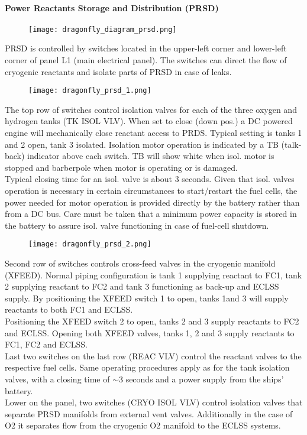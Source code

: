 \documentclass[Orbiter User Manual.tex]{subfiles}
\begin{document}
\paragraph{Power Reactants Storage and Distribution (PRSD)}

\begin{figure}[H]
  \centering
  \texttt{[image: dragonfly\_diagram\_prsd.png]}
\end{figure}

\noindent
PRSD is controlled by switches located in the upper-left corner and lower-left corner of panel L1 (main electrical panel). The switches can direct the flow of cryogenic reactants and isolate parts of PRSD in case of leaks.

\begin{figure}[H]
  \centering
  \texttt{[image: dragonfly\_prsd\_1.png]}
\end{figure}

\noindent
The top row of switches control isolation valves for each of the three oxygen and hydrogen tanks (TK ISOL VLV). When set to close (down pos.) a DC powered engine will mechanically close reactant access to PRDS. Typical setting is tanks 1 and 2 open, tank 3 isolated. Isolation motor operation is indicated by a TB (talk-back) indicator above each switch. TB will show white when isol. motor is stopped and barberpole when motor is operating or is damaged.\\
Typical closing time for an isol. valve is about 3 seconds. Given that isol. valves operation is necessary in certain circumstances to start/restart the fuel cells, the power needed for motor operation is provided directly by the battery rather than from a DC bus. Care must be taken that a minimum power capacity is stored in the battery to assure isol. valve functioning in case of fuel-cell shutdown.

\begin{figure}[H]
  \centering
  \texttt{[image: dragonfly\_prsd\_2.png]}
\end{figure}

\noindent
Second row of switches controls cross-feed valves in the cryogenic manifold (XFEED). Normal piping configuration is tank 1 supplying reactant to FC1, tank 2 supplying reactant to FC2 and tank 3 functioning as back-up and ECLSS supply. By positioning the XFEED switch 1 to open, tanks 1and 3 will supply reactants to both FC1 and ECLSS.\\
Positioning the XFEED switch 2 to open, tanks 2 and 3 supply reactants to FC2 and ECLSS. Opening both XFEED valves, tanks 1, 2 and 3 supply reactants to FC1, FC2 and ECLSS.\\
Last two switches on the last row (REAC VLV) control the reactant valves to the respective fuel cells. Same operating procedures apply as for the tank isolation valves, with a closing time of $\sim$3
seconds and a power supply from the ships' battery.\\
Lower on the panel, two switches (CRYO ISOL VLV) control isolation valves that separate PRSD manifolds from external vent valves. Additionally in the case of O2 it separates flow from the cryogenic O2 manifold to the ECLSS systems.
\end{document}
